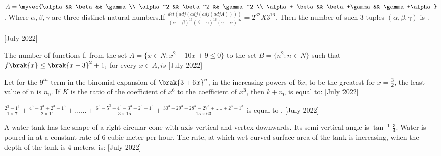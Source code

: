 \iffalse
  \title{2022}
  \author{ai24btech11005}
  \section{integer}
\fi
  \item $A= \myvec{\alpha && \beta && \gamma \\ \alpha^2 && \beta^2 && \gamma^2 \\ \alpha + \beta && \beta +\gamma && \gamma +\alpha}$ . Where $\alpha, \beta,\gamma$ are three distinct natural numbers.If $\frac{det(adj(adj(adj(adjA))))}{(\alpha - \beta)^{16} (\beta - \gamma)^{16} (\gamma -\alpha)^{16}} =2^{32} X 3^{16}$.  Then the number of such 3-tuples $(\alpha , \beta, \gamma)$ is .

    \hfill{[July 2022]}
    \item The number of functions f, from the set $A= \{x \in N: x^2-10x+9 \leq 0 \}$ to the set
    $B= \{ n^2 : n\in N\}$ such that $f\brak{x}\leq
     \brak{x-3}^2+1,$ for every $x \in A, is $
   \hfill{[July 2022]}
    \item Let for the $9^{th}$ term in the binomial expansion of $\brak{3+6x}^n$, in the increasing powers of $6x$, to be the greatest for $x=\frac{3}{2}$, the least value of n is $n_0$.  If $K$ 
    is the ratio of the coefficient of $x^6$ to the coefficient of $x^3$, then $k+n_0$ is equal to:
 \hfill{[July 2022]}

    \item $\frac{2^3-1^3}{1\times7} + \frac{4^3-3^3+2^3-1^3}{2\times 11} +......+\frac{6^3-5^3+4^3-3^3+2^3-1^3}{3\times 15} +\frac{30^3-29^3+28^3-27^3+.....+2^3-1^3}{15\times 63}$ is equal to .
\hfill{[July 2022]}
    \item A water tank has the shape of a right circular cone with axis vertical and vertex downwards. Its semi-vertical angle is $\tan^{-1}\frac{3}{4}$. Water is poured in at a constant rate of 6 cubic  meter per hour. The rate, at which wet curved surface area of the tank is increasing, when the depth of the tank is 4 meters, is:
   \hfill{[July 2022]}

